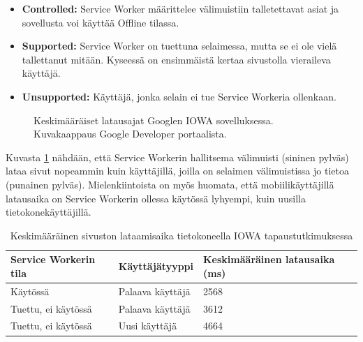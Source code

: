 \documentclass{tktltiki}
\begin{document}
\begin{itemize}
  \item \textbf{Controlled:} Service Worker määrittelee välimuistiin talletettavat asiat ja sovellusta voi käyttää Offline tilassa.
  \item \textbf{Supported:} Service Worker on tuettuna selaimessa, mutta se ei ole vielä tallettanut mitään. Kyseessä on ensimmäistä kertaa sivustolla vieraileva käyttäjä.
  \item \textbf{Unsupported:} Käyttäjä, jonka selain ei tue Service Workeria ollenkaan. 
\end{itemize}

\begin{figure}[h]
\begin{center}
\caption{Keskimääräiset latausajat Googlen IOWA sovelluksessa. Kuvakaappaus Google Developer portaalista.}
\label{Google AVG load times}
\end{center}
\end{figure}

Kuvasta \ref{Google AVG load times} nähdään, että Service Workerin hallitsema välimuisti (sininen pylväs) lataa sivut nopeammin kuin käyttäjillä, joilla on selaimen välimuistissa jo tietoa (punainen pylväs). Mielenkiintoista on myös huomata, että mobiilikäyttäjillä latausaika on Service Workerin ollessa käytössä lyhyempi, kuin uusilla tietokonekäyttäjillä. 

\begin{table}[h]
\centering
\begin{small}
\caption{Keskimääräinen sivuston lataamisaika tietokoneella IOWA tapaustutkimuksessa \cite{Walton} }
\begin{tabular}{|L{5cm}|L{5cm}|L{5cm}|}
\hline
\textbf{Service Workerin tila} & 
\textbf{Käyttäjätyyppi} &
\textbf{Keskimääräinen latausaika (ms)}
\\ \hline
Käytössä & 
Palaava käyttäjä &
2568
\\ \hline
Tuettu, ei käytössä & 
Palaava käyttäjä &
3612
\\ \hline
Tuettu, ei käytössä & 
Uusi käyttäjä &
4664
\\ \hline
\end{tabular}
\label{table:loading time on pc}
\end{small}
\end{table}

\clearpage
\end{document}
